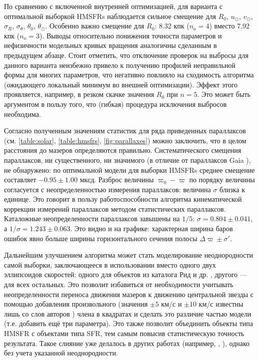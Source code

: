 \documentclass[a4paper, oneside, 14pt]{article}
\begin{document}
По сравнению с включенной внутренней оптимизацией, для варианта с оптимальной выборкой HMSFRs наблюдается сильное смещение для $ R_0 $, $ u_\odot $, $ v_\odot $, $ \sigma_R $, $ \sigma_\theta $, $ \theta_0 $, $ \theta_\odot $. Особенно важно смещение для $ R_0 $: 8.32 кпк ($ n_\text{o} = 4 $) вместо 7.92 кпк ($ n_\text{o} = 3 $). Выводы относительно понижения точности параметров
и нефизичности модельных кривых вращения аналогичны сделанным в предыдущем абзаце. Стоит отметить, что отключение проверок на выбросы для данного варианта неизбежно привело к получению профилей неправильной формы для многих параметров, что негативно повлияло на сходимость алгоритма (ожидающего локальный минимум во внешней оптимизации). Эффект этого проявляется, например, в резком скачке значения $ R_0 $ при $ n = 5 $. Это может быть аргументом в пользу того, что (гибкая) процедура исключения выбросов необходима.

Согласно полученным значениям статистик для ряда приведенных параллаксов (см. \autoref{table:solar}, \autoref{table:hmsfrs}, \autoref{fig:parallaxes}) можно заключить, что в целом расстояния до мазеров определяются правильно. Систематического смещения параллаксов, ни существенного, ни значимого (в отличие от параллаксов Gaia \cite{B.2021}), не обнаружено: по оптимальной модели для выборки HMSFRs среднее смещение составляет $ -0.95 \pm 1.00 $ мксд. Разброс величины $ \varpi_0 - \varpi $ по порядку величины согласуется с неопределенностью измерения параллаксов: величина $ \sigma $ близка к единице. Это говорит в пользу работоспособности алгоритма кинематической коррекции измерений параллаксов методом статистических параллаксов. Каталожные неопределенности параллаксов завышены на $ 1 / 5 $: $ \sigma = 0.804 \pm 0.041 $, а $ 1 / \sigma = 1.243 \pm 0.063 $. Это видно и на графике: характерная ширина баров ошибок явно больше ширины горизонтального сечения полосы $ \Delta\varpi \pm \sigma' $.

Дальнейшим улучшением алгоритма может стать моделирование неоднородности самой выборки, заключающееся в использовании вместо одного двух эллипсоидов скоростей: одного для объектов из каталога Рид и др. \cite{R.2019}, другого --- для всех остальных. Это позволит избавиться от необходимости учитывать неопределенности переноса движения мазеров к движению центральной звезды с помощью добавления произвольного (значения $ \pm 5 $ км/с и $ \pm 10 $ км/с известны лишь со слов авторов \cite{R.2019}) члена в квадратах и сделать это различие частью модели (т.е. добавить ещё три параметра). Это также позволит объединить объекты типа HMSFR с объектами типа SFR, тем самым повысив статистическую точность результата. Такое слияние уже делалось в других работах (например, \cite{R.2017}, \cite{VERA.2020}), однако без учета указанной неоднородности.
\end{document}
